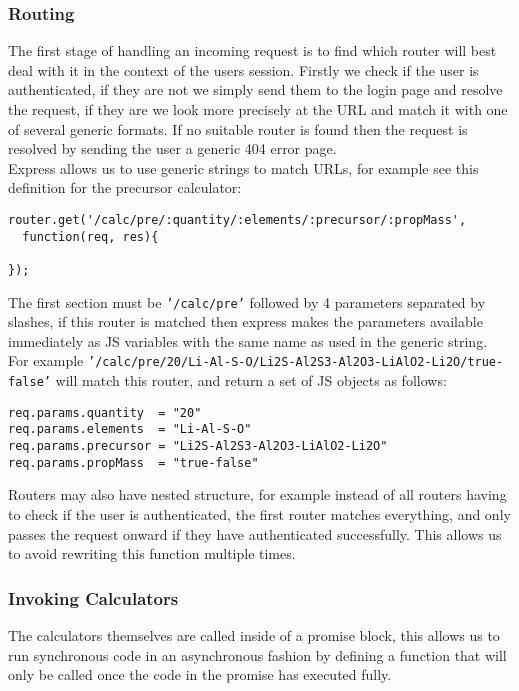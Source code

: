 \subsubsection{Routing}
The first stage of handling an incoming request is to find which router will best deal with it in the context of the users session. Firstly we check if the user is authenticated, if they are not we simply send them to the login page and resolve the request, if they are we look more precisely at the URL and match it with one of several generic formats. If no suitable router is found then the request is resolved by sending the user a generic 404 error page. \\

Express allows us to use generic strings to match URLs, for example see this definition for the precursor calculator:  
\begin{verbatim}
router.get('/calc/pre/:quantity/:elements/:precursor/:propMass',
  function(req, res){

}); 
\end{verbatim}

The first section must be \texttt{'/calc/pre'} followed by 4 parameters separated by slashes, if this router is matched then express makes the parameters available immediately as JS variables with the same name as used in the generic string. \\

For example \texttt{'/calc/pre/20/Li-Al-S-O/Li2S-Al2S3-Al2O3-LiAlO2-Li2O/true-false'} will match this router, and return a set of JS objects as follows:

\begin{verbatim}
req.params.quantity  = "20"
req.params.elements  = "Li-Al-S-O"
req.params.precursor = "Li2S-Al2S3-Al2O3-LiAlO2-Li2O"
req.params.propMass  = "true-false"
\end{verbatim}

Routers may also have nested structure, for example instead of all routers having to check if the user is authenticated, the first router matches everything, and only passes the request onward if they have authenticated successfully. This allows us to avoid rewriting this function multiple times.

\subsubsection{Invoking Calculators}
The calculators themselves are called inside of a promise block, this allows us to run synchronous code in an asynchronous fashion by defining a function that will only be called once the code in the promise has executed fully.

